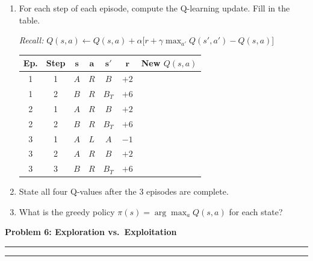 \documentclass[12pt]{article}
\newcommand{\question}[1]{%
  \clearpage
  \vspace{0.5cm}
  {\noindent\normalsize \textbf{#1}}
  \vspace{0.2cm}
  \hrule
  \vspace{0.1cm}
  \hrule
  \vspace{0.3cm}
}
\begin{document}
\begin{enumerate}[label=(\alph*)]
\item For each step of each episode, compute the Q-learning update. Fill in the table.

\textit{Recall:} $Q(s,a) \leftarrow Q(s,a) + \alpha\big[r + \gamma \max_{a'} Q(s',a') - Q(s,a)\big]$

\begin{center}
\begin{tabular}{ccccccl}
\toprule
\textbf{Ep.} & \textbf{Step} & $\mathbf{s}$ & $\mathbf{a}$ & $\mathbf{s'}$ & $\mathbf{r}$ & \textbf{New $Q(s,a)$} \\
\midrule
1 & 1 & $A$ & $R$ & $B$ & $+2$ & \\[0.4em]
1 & 2 & $B$ & $R$ & $B_T$ & $+6$ & \\[0.4em]
\midrule
2 & 1 & $A$ & $R$ & $B$ & $+2$ & \\[0.4em]
2 & 2 & $B$ & $R$ & $B_T$ & $+6$ & \\[0.4em]
\midrule
3 & 1 & $A$ & $L$ & $A$ & $-1$ & \\[0.4em]
3 & 2 & $A$ & $R$ & $B$ & $+2$ & \\[0.4em]
3 & 3 & $B$ & $R$ & $B_T$ & $+6$ & \\[0.4em]
\bottomrule
\end{tabular}
\end{center}

\vspace{5cm}

\item State all four Q-values after the 3 episodes are complete.

\vspace{3cm}

\item What is the greedy policy $\pi(s) = \arg\max_a Q(s,a)$ for each state?

\vspace{2cm}
\end{enumerate}


\question{Problem 6: Exploration vs.\ Exploitation}\label{prob:explore}
\end{document}
